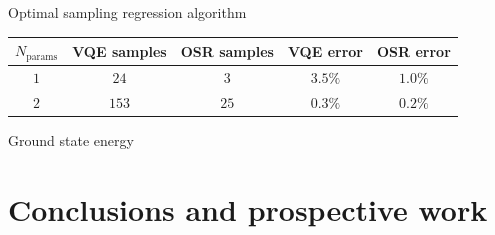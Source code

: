 \documentclass[9pt, handout, aspectratio=169]{beamer}	%
\begin{document}
\begin{frame}[allowframebreaks]{Optimal sampling regression algorithm}
\vspace{-1em}

\begin{table}[!bp]
	\centering
	\begin{tabular}{ c c c c c }
		\hline
		$N_\text{params}$ & VQE samples & OSR samples &
		VQE error & OSR error \\
		\hline
		\hline
		$1$ & $24$ & $3$ & $3.5\%$ & $1.0\%$ \\
		\hline
		$2$ & $153$ & $25$ & $0.3\%$ & $0.2\%$ \\
		\hline
	\end{tabular}
\end{table}

\end{frame}


\begin{frame}{Ground state energy}

\end{frame}


\section{Conclusions and prospective work}


\end{document}
